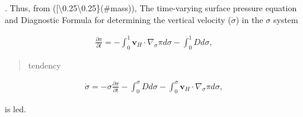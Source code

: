 . Thus, from ({[}\textbackslash0.25\textbackslash0.25\}(\#mass)), The
time-varying surface pressure equation and Diagnostic Formula for
determining the vertical velocity (\(\dot{\sigma}\)) in the \(\sigma\)
system

\begin{eqnarray}
   \frac{\partial \pi}{\partial t}
   = - \int_{0}^{1} \mathbf{v}_{H} \cdot \nabla_{\sigma} \pi d \sigma
     - \int_{0}^{1} D  d \sigma ,
\end{eqnarray}

\begin{quote}
\protect\hypertarget{barometricux20tendency}{}{\blazing tendency }
\end{quote}

\begin{eqnarray}
   \dot{\sigma} 
   = - \sigma 
     \frac{\partial \pi}{\partial t}
     - \int_{0}^{\sigma} D d \sigma
     - \int_{0}^{\sigma} 
         \mathbf{v}_{H} \cdot \nabla_{\sigma} \pi d \sigma ,
\end{eqnarray}

\begin{quote}
\protect\hypertarget{verticalux20speed}{}{}
\end{quote}

is led.

